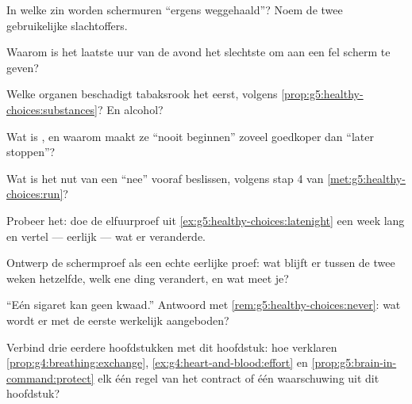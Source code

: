 \begin{exercise}[$\star$]\label{exo:g5:healthy-choices:3}
In welke zin worden schermuren ``ergens weggehaald''? Noem de twee
gebruikelijke slachtoffers.
\end{exercise}

\begin{exercise}[$\star$]\label{exo:g5:healthy-choices:4}
Waarom is het laatste uur van de avond het slechtste om aan een fel
scherm te geven?
\end{exercise}

\begin{exercise}[$\star$]\label{exo:g5:healthy-choices:5}
Welke organen beschadigt tabaksrook het eerst, volgens
\cref{prop:g5:healthy-choices:substances}? En alcohol?
\end{exercise}

\begin{exercise}[$\star$]\label{exo:g5:healthy-choices:6}
Wat is , en waarom maakt ze ``nooit beginnen'' zoveel
goedkoper dan ``later stoppen''?
\end{exercise}

\begin{exercise}[$\star$]\label{exo:g5:healthy-choices:7}
Wat is het nut van een ``nee'' vooraf beslissen, volgens stap 4 van
\cref{met:g5:healthy-choices:run}?
\end{exercise}

\begin{exercise}[$\star$]\label{exo:g5:healthy-choices:8}
Probeer het: doe de elfuurproef uit
\cref{ex:g5:healthy-choices:latenight} een week lang en vertel ---
eerlijk --- wat er veranderde.
\end{exercise}

\begin{exercise}[$\star\star$]\label{exo:g5:healthy-choices:9}
Ontwerp de schermproef als een echte eerlijke proef: wat blijft er tussen
de twee weken hetzelfde, welk ene ding verandert, en wat meet je?
\end{exercise}

\begin{exercise}[$\star\star$]\label{exo:g5:healthy-choices:10}
``Eén sigaret kan geen kwaad.'' Antwoord met
\cref{rem:g5:healthy-choices:never}: wat wordt er met de eerste
werkelijk aangeboden?
\end{exercise}

\begin{exercise}[$\star\star\star$]\label{exo:g5:healthy-choices:11}
Verbind drie eerdere hoofdstukken met dit hoofdstuk: hoe verklaren
\cref{prop:g4:breathing:exchange},
\cref{ex:g4:heart-and-blood:effort} en
\cref{prop:g5:brain-in-command:protect} elk één regel van het contract of
één waarschuwing uit dit hoofdstuk?
\end{exercise}
